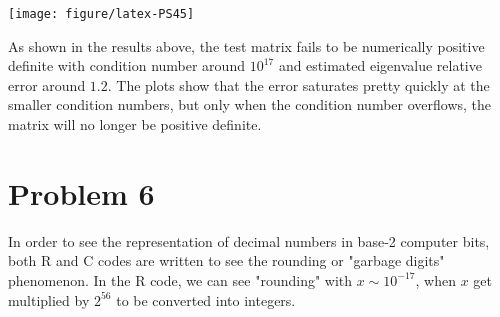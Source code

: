 \documentclass{article}\usepackage{graphicx, color}
\makeatletter
\def\maxwidth{ %
  \ifdim\Gin@nat@width>\linewidth
    \linewidth
  \else
    \Gin@nat@width
  \fi
}
\newenvironment{knitrout}{}{} %
\makeatother
\begin{document}
\begin{knitrout}
{\centering \texttt{[image: figure/latex-PS45]} 

}


\end{knitrout}


As shown in the results above, the test matrix fails to be numerically positive definite with
condition number around $10^{17}$ and estimated eigenvalue relative error around $1.2$.
The plots show that the error saturates pretty quickly at the smaller condition numbers, 
but only when the condition number overflows, the matrix will no longer be positive definite.

\newpage
\section*{Problem 6}
In order to  see the representation of decimal numbers in base-2 computer bits, both R and C codes are
written to see the rounding or "garbage digits" phenomenon.
In the R code, we can see "rounding" with $x \sim 10^{-17}$, 
when $x$ get multiplied by $2^{56}$ to be converted into integers.
\end{document}
